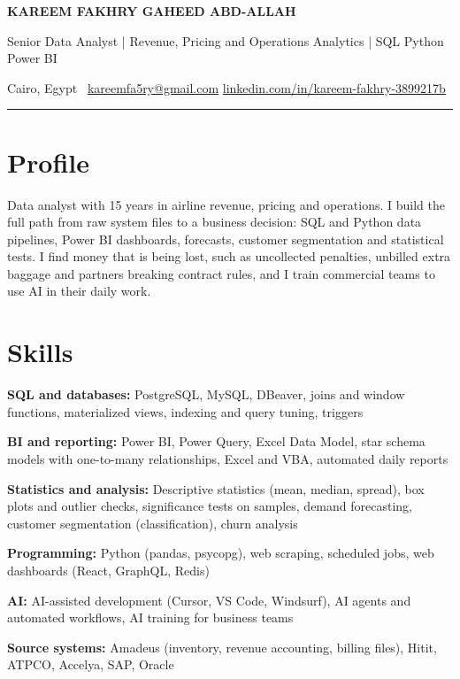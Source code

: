 


{\LARGE\bfseries KAREEM FAKHRY GAHEED ABD-ALLAH}\par\vspace{3pt}
{\color{muted}Senior Data Analyst | Revenue, Pricing and Operations Analytics | SQL \textperiodcentered{} Python \textperiodcentered{} Power BI}\par\vspace{3pt}
{\small\color{muted}Cairo, Egypt \ifx\cvphone\empty\else\enspace\textperiodcentered\enspace \cvphone\ \fi\enspace\textperiodcentered\enspace \href{mailto:kareemfa5ry@gmail.com}{kareemfa5ry@gmail.com} \enspace\textperiodcentered\enspace \href{https://www.linkedin.com/in/kareem-fakhry-3899217b/}{linkedin.com/in/kareem-fakhry-3899217b}}\par\vspace{2pt}
{\color{rule}\rule{\linewidth}{0.6pt}}

\section{Profile}
Data analyst with 15 years in airline revenue, pricing and operations. I build the full path from raw system files to a business decision: SQL and Python data pipelines, Power BI dashboards, forecasts, customer segmentation and statistical tests. I find money that is being lost, such as uncollected penalties, unbilled extra baggage and partners breaking contract rules, and I train commercial teams to use AI in their daily work.\par

\section{Skills}
\textbf{SQL and databases:} PostgreSQL, MySQL, DBeaver, joins and window functions, materialized views, indexing and query tuning, triggers\par\vspace{1pt}
\textbf{BI and reporting:} Power BI, Power Query, Excel Data Model, star schema models with one-to-many relationships, Excel and VBA, automated daily reports\par\vspace{1pt}
\textbf{Statistics and analysis:} Descriptive statistics (mean, median, spread), box plots and outlier checks, significance tests on samples, demand forecasting, customer segmentation (classification), churn analysis\par\vspace{1pt}
\textbf{Programming:} Python (pandas, psycopg), web scraping, scheduled jobs, web dashboards (React, GraphQL, Redis)\par\vspace{1pt}
\textbf{AI:} AI-assisted development (Cursor, VS Code, Windsurf), AI agents and automated workflows, AI training for business teams\par\vspace{1pt}
\textbf{Source systems:} Amadeus (inventory, revenue accounting, billing files), Hitit, ATPCO, Accelya, SAP, Oracle\par\vspace{1pt}

